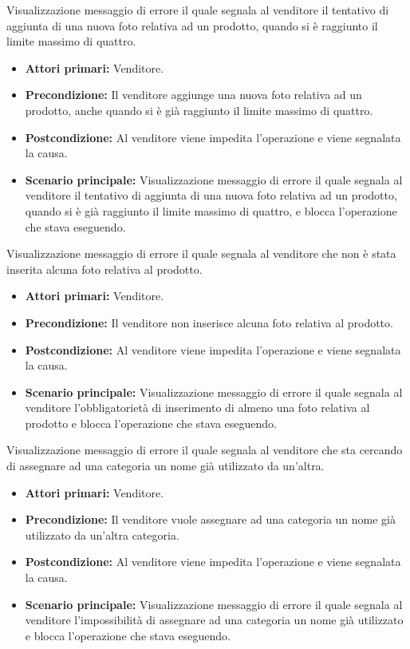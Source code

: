 Visualizzazione messaggio di errore il quale segnala al venditore il tentativo di aggiunta di una nuova foto relativa ad un prodotto, quando si è raggiunto il limite massimo di quattro.
\begin{itemize}
    \item \textbf{Attori primari:} Venditore.
    \item \textbf{Precondizione:} Il venditore aggiunge una nuova foto relativa ad un prodotto, anche quando si è già raggiunto il limite massimo di quattro.
    \item \textbf{Postcondizione:} Al venditore viene impedita l'operazione e viene segnalata la causa.
    \item \textbf{Scenario principale:} Visualizzazione messaggio di errore il quale segnala al venditore il tentativo di aggiunta di una nuova foto relativa ad un prodotto, quando si è già raggiunto il limite massimo di quattro, e blocca l'operazione che stava eseguendo.
\end{itemize}

Visualizzazione messaggio di errore il quale segnala al venditore che non è stata inserita alcuna foto relativa al prodotto.
\begin{itemize}
    \item \textbf{Attori primari:} Venditore.
    \item \textbf{Precondizione:} Il venditore non inserisce alcuna foto relativa al prodotto.
    \item \textbf{Postcondizione:} Al venditore viene impedita l'operazione e viene segnalata la causa.
    \item \textbf{Scenario principale:} Visualizzazione messaggio di errore il quale segnala al venditore l'obbligatorietà di inserimento di almeno una foto relativa al prodotto e blocca l'operazione che stava eseguendo.
\end{itemize}

Visualizzazione messaggio di errore il quale segnala al venditore che sta cercando di assegnare ad una categoria un nome già utilizzato da un'altra.
\begin{itemize}
    \item \textbf{Attori primari:} Venditore.
    \item \textbf{Precondizione:} Il venditore vuole assegnare ad una categoria un nome già utilizzato da un'altra categoria.
    \item \textbf{Postcondizione:} Al venditore viene impedita l'operazione e viene segnalata la causa.
    \item \textbf{Scenario principale:} Visualizzazione messaggio di errore il quale segnala al venditore l'impossibilità di assegnare ad una categoria un nome già utilizzato e blocca l'operazione che stava eseguendo.
\end{itemize}

